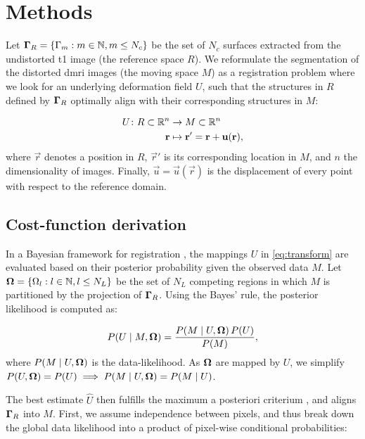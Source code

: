 \section{Methods}
\label{sec:methods}
%
Let $\boldsymbol{\Gamma}_R = \{\Gamma_m: m \in \mathbb{N}, m \leq N_c\}$ be the set of $N_c$ surfaces
  extracted from the undistorted \gls*{t1} image (the reference space $R$).
We reformulate the segmentation of the distorted \gls*{dmri} images (the moving space $M$)
  as a registration problem where we look for an underlying deformation field $U$, such that 
  the structures in $R$ defined by $\boldsymbol{\Gamma}_R$ optimally align with their corresponding
  structures in $M$:

  \begin{align}
  U\colon R \subset \mathbb{R}^n &\to M \subset \mathbb{R}^n \notag\\
  \vec{r} &\mapsto \vec{r}' =\vec{r}+\vec{u}(\vec{r}),
  \label{eq:transform}
  \end{align}
%
  where $\vec{r}$ denotes a position in $R$, $\vec{r}'$ is
  its corresponding location in $M$, and $n$ the dimensionality of images.
Finally, $\vec{u} = \vec{u}(\vec{r})$ is the displacement of every point with respect
  to the reference domain.

\subsection{Cost-function derivation}\label{sec:methods_map}
%
In a Bayesian framework for registration \citep{wyatt_map_2003,pohl_bayesian_2006,gass_simultaneous_2014},
  the mappings $U$ in \eqref{eq:transform} are
  evaluated based on their posterior probability given the observed data
  $M$.
Let $\boldsymbol{\Omega} = \{\Omega_l: l \in \mathbb{N}, l \leq N_L\}$ be the set of $N_L$ competing regions in
  which $M$ is partitioned by the projection of $\boldsymbol{\Gamma}_R$.
Using the Bayes' rule, the posterior likelihood is computed as:

  \begin{equation}
  P(U \mid M, \omegaset ) = \frac{P(M \mid U,\omegaset )\, P(U)}{P(M)},
  \label{eq:bayes_rule}
  \end{equation}
%
  where $P(M \mid U,\boldsymbol{\Omega})$ is the data-likelihood.
As $\boldsymbol{\Omega}$ are mapped by $U$, we simplify
  $P(U, \boldsymbol{\Omega}) = P(U) \implies P(M \mid U,\boldsymbol{\Omega}) = P(M \mid U)$.

The best estimate $\hat{U}$ then fulfills the maximum a posteriori criterium
  \citep{bishop_pattern_2006}, and aligns $\boldsymbol{\Gamma}_R$ into $M$.
First, we assume independence between pixels, and thus break down the
  global data likelihood into a product of pixel-wise conditional probabilities:

